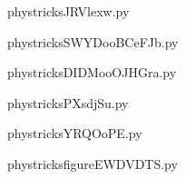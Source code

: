     \newcommand{\CaptionFigJRVlexw}{<+Type your caption here+>}
    \begin{center}
        
    \end{center}
    phystricksJRVlexw.py

    

    \clearpage
    


    \newcommand{\CaptionFigSWYDooBCeFJb}{<+Type your caption here+>}
    \begin{center}
        
    \end{center}
    phystricksSWYDooBCeFJb.py

    

    \clearpage
    


    \newcommand{\CaptionFigDIDMooOJHGra}{<+Type your caption here+>}
    \begin{center}
        
    \end{center}
    phystricksDIDMooOJHGra.py

    

    \clearpage
    


    \newcommand{\CaptionFigPXsdjSu}{<+Type your caption here+>}
    \begin{center}
        
    \end{center}
    phystricksPXsdjSu.py

    

    \clearpage
    


    \newcommand{\CaptionFigYRQOoPE}{<+Type your caption here+>}
    \begin{center}
        
    \end{center}
    phystricksYRQOoPE.py

    

    \clearpage
    


    \newcommand{\CaptionFigfigureEWDVDTS}{<+Type your caption here+>}
    \begin{center}
        
    \end{center}
    phystricksfigureEWDVDTS.py

